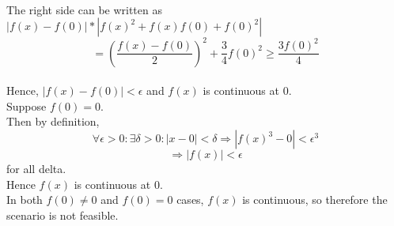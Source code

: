 \documentclass{article}
\begin{document}
\\The right side can be written as $|f(x) - f(0)| * |f(x)^2 + f(x)f(0) + f(0)^2|$
$$= (\frac{f(x)-f(0)}{2})^2 + \frac{3}{4}f(0)^2 \geq \frac{3f(0)^2}{4}$$
\\Hence, $|f(x) - f(0)| < \epsilon$ and $f(x)$ is continuous at 0.
\\Suppose $f(0) = 0$.
\\Then by definition, $$\forall \epsilon > 0 : \exists \delta > 0 : |x - 0| < \delta \Rightarrow |f(x)^3 - 0| < \epsilon^3$$
$$\Rightarrow |f(x)| < \epsilon$$ for all delta.
\\Hence $f(x)$ is continuous at 0.
\\In both $f(0) \not = 0$ and $f(0) = 0$ cases, $f(x)$ is continuous, so therefore the scenario is not feasible.
\end{document}
